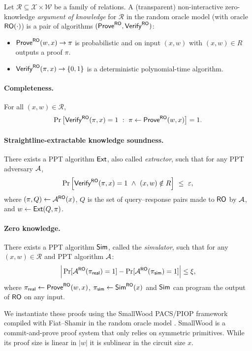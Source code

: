 \begin{definition}\label{def:nizk-ark}
Let $\mathcal{R}\subseteq \mathcal{X}\times \mathcal{W}$  be a family of relations.
A (transparent) non-interactive zero-knowledge \emph{argument of knowledge} for $\mathcal{R}$ in the random oracle model
(with oracle $\mathsf{RO}(\cdot)$) is a pair of algorithms $(\mathsf{Prove}^{\mathsf{RO}},\mathsf{Verify}^{\mathsf{RO}})$:
\begin{itemize}[leftmargin=1.25em]
  \item $\mathsf{Prove}^{\mathsf{RO}}(w ,x)\to \pi$ is probabilistic and on input $(x,w)$ with
  $(x,w)\in R$ outputs a proof $\pi$.
  \item $\mathsf{Verify}^{\mathsf{RO}}(\pi,x)\to \{0,1\}$ is a deterministic polynomial-time algorithm.
\end{itemize}

\paragraph{Completeness.}
For all $(x,w)\in\mathcal{R}$,
\[
  \Pr\big[\ZKVerify^{\RO}(\pi,x)=1 \ :\ \pi\gets \ZKProve^{\RO}(w,x)\big]=1.
\]

\paragraph{Straightline-extractable knowledge soundness.} 
There exists a PPT algorithm $\mathsf{Ext}$, also called \emph{extractor}, such that for any PPT adversary $\mathcal{A}$,
\[
  \Pr\Big[
    \mathsf{Verify}^{\mathsf{RO}}(\pi,x)=1 \ \wedge\ (x,w)\notin R
  \Big]\ \le\ \varepsilon,
\]
where $(\pi,Q)\leftarrow \mathcal{A}^{\mathsf{RO}}(x)$, $Q$ is the set of query--response pairs made to $\mathsf{RO}$ by $\mathcal{A}$,
and $w\leftarrow \mathsf{Ext}(Q,\pi)$.

\paragraph{Zero knowledge.}
There exists a PPT algorithm $\mathsf{Sim}$, called the \emph{simulator}, such that for any $(x,w)\in \mathcal{R}$ and PPT algorithm $\mathcal{A}$:
\[
  \Big|\Pr[\mathcal{A}^{\mathsf{RO}}(\pi_{\mathsf{real}})=1]-\Pr[\mathcal{A}^{\mathsf{RO}}(\pi_{\mathsf{sim}})=1]\Big|
  \le \xi,
\]
where $\pi_{\mathsf{real}}\gets \mathsf{Prove}^{\mathsf{RO}}(w ,x)$,  $\pi_{\mathsf{sim}}\gets \mathsf{Sim}^{\mathsf{RO}}(x)$ and $\mathsf{Sim}$ can program the output of $\mathsf{RO}$ on any input.
\end{definition}

We instantiate these proofs using the SmallWood PACS/PIOP framework compiled with Fiat--Shamir in the random oracle
model \cite{EPRINT:FenRiv25b}. SmallWood is a commit-and-prove proof system that only relies on symmetric primitives. While its proof size is linear in $|w|$ it is sublinear in the circuit size $x$.

